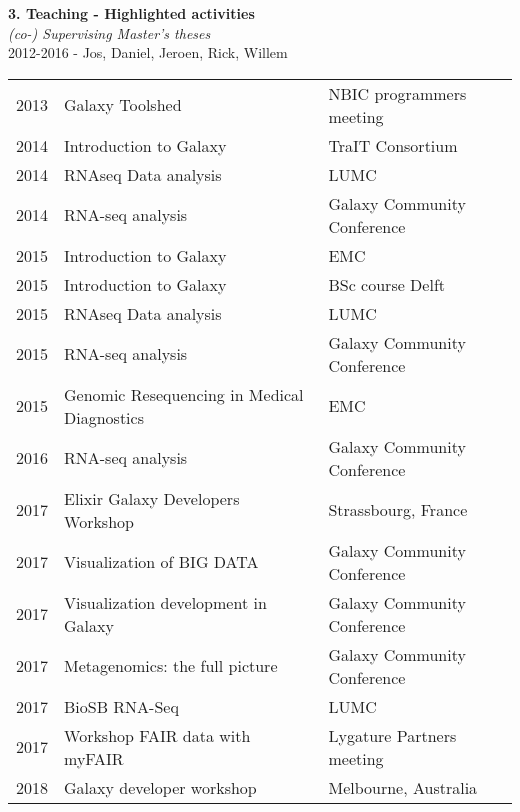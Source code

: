 \begin{table}[h!]
    \textbf{3. Teaching - Highlighted activities} \\

    \textit{(co-) Supervising Master’s theses} \\
    2012-2016 - Jos, Daniel, Jeroen, Rick, Willem \\


    \begin{tabular}{lll}
        2013 & Galaxy Toolshed                                 & NBIC programmers meeting \\
        2014 & Introduction to Galaxy                          & TraIT Consortium \\
        2014 & RNAseq Data analysis                            & LUMC \\
        2014 & RNA-seq analysis                                & Galaxy Community Conference \\
        2015 & Introduction to Galaxy                          & EMC \\
        2015 & Introduction to Galaxy                          & BSc course Delft \\
        2015 & RNAseq Data analysis                            & LUMC \\
        2015 & RNA-seq analysis                                & Galaxy Community Conference \\
        2015 & Genomic Resequencing in Medical Diagnostics     & EMC \\
        2016 & RNA-seq analysis                                & Galaxy Community Conference \\
        2017 & Elixir Galaxy Developers Workshop               & Strassbourg, France \\
        2017 & Visualization of BIG DATA                       & Galaxy Community Conference \\
        2017 & Visualization development in Galaxy             & Galaxy Community Conference \\
        2017 & Metagenomics: the full picture                  & Galaxy Community Conference \\
        2017 & BioSB RNA-Seq                                   & LUMC \\
        2017 & Workshop FAIR data with myFAIR                  & Lygature Partners meeting \\
        2018 & Galaxy developer workshop                       & Melbourne, Australia \\

\end{tabular}
\end{table}
